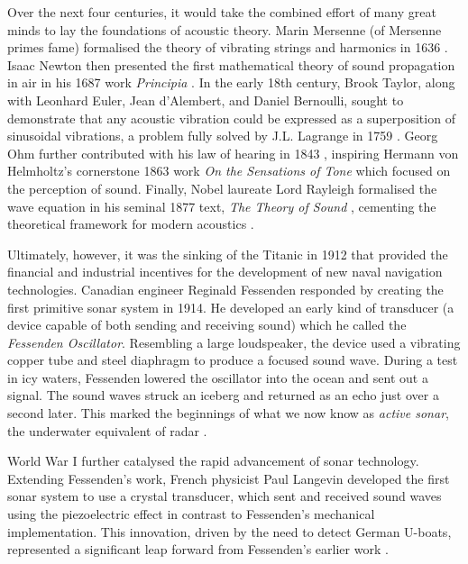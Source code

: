 Over the next four centuries, it would take the combined effort of many great minds to lay the foundations of acoustic theory. Marin Mersenne (of Mersenne primes fame) formalised the theory of vibrating strings and harmonics in 1636 \cite{mersenne_harmonie_1957}. Isaac Newton then presented the first mathematical theory of sound propagation in air in his 1687 work \textit{Principia} \cite{newton_principia_2013}. In the early 18th century, Brook Taylor, along with Leonhard Euler, Jean d'Alembert, and Daniel Bernoulli, sought to demonstrate that any acoustic vibration could be expressed as a superposition of sinusoidal vibrations, a problem fully solved by J.L. Lagrange in 1759 \cite{darrigol_acoustic_2007}. Georg Ohm further contributed with his law of hearing in 1843 \cite{dixon_ward_musical_1970}, inspiring Hermann von Helmholtz's cornerstone 1863 work \textit{On the Sensations of Tone} \cite{helmholtz_sensations_1954} which focused on the perception of sound. Finally, Nobel laureate Lord Rayleigh formalised the wave equation in his seminal 1877 text, \textit{The Theory of Sound} \cite{rayleigh_theory_2011}, cementing the theoretical framework for modern acoustics \cite{vaccaro_past_1998}.

Ultimately, however, it was the sinking of the Titanic in 1912 that provided the financial and industrial incentives for the development of new naval navigation technologies. Canadian engineer Reginald Fessenden responded by creating the first primitive sonar system in 1914. He developed an early kind of transducer (a device capable of both sending and receiving sound) which he called the \textit{Fessenden Oscillator}. Resembling a large loudspeaker, the device used a vibrating copper tube and steel diaphragm to produce a focused sound wave. During a test in icy waters, Fessenden lowered the oscillator into the ocean and sent out a signal. The sound waves struck an iceberg and returned as an echo just over a second later. This marked the beginnings of  what we now know as \textit{active sonar}, the underwater equivalent of radar \cite{dinneen_reginald_2020, vaccaro_past_1998}.

World War I further catalysed the rapid advancement of sonar technology. Extending Fessenden's work, French physicist Paul Langevin developed the first sonar system to use a crystal transducer, which sent and received sound waves using the piezoelectric effect in contrast to Fessenden's mechanical implementation. This innovation, driven by the need to detect German U-boats, represented a significant leap forward from Fessenden's earlier work \cite{rodriguez_fundamentals_2023}. 


